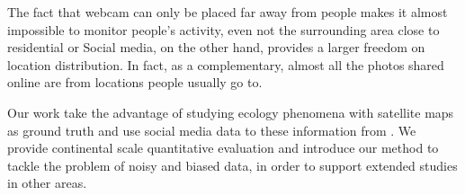 The fact that webcam can only be placed far away from people 
 makes it almost impossible to monitor people's activity, even not the surrounding area close to
residential or 
 Social media, on the other hand, provides a larger freedom on location distribution. 
In fact, as a complementary, almost all the photos shared online are from locations people usually go to. 

Our work take the advantage of studying ecology phenomena with 
 satellite maps as
 ground truth and use social media data to  these information from 
 . We provide continental scale quantitative evaluation and introduce our
 method to tackle the problem of noisy and biased data, in order to support extended studies in other areas. 

